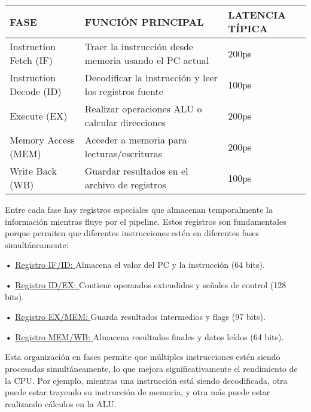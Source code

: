 \documentclass{article}
\begin{document}
\quad

\begin{tabular}{| p{4cm} |p{4cm} | p{4cm} |}
    \hline
    FASE & FUNCIÓN PRINCIPAL & LATENCIA TÍPICA \\
    \hline
    Instruction Fetch (IF) & Traer la instrucción desde memoria usando el PC actual & 200ps
\\
    \hline
    Instruction Decode (ID) & Decodificar la instrucción y leer los registros fuente & 100ps \\
    \hline
    Execute (EX) & Realizar operaciones ALU o calcular direcciones & 200ps \\
    \hline
    Memory Access (MEM) & Acceder a memoria para lecturas/escrituras & 200ps \\
    \hline
    Write Back (WB) & Guardar resultados en el archivo de registros & 100ps
 \\
    \hline

\end{tabular}\vspace{0.8cm}

{ Entre cada fase hay registros especiales que almacenan temporalmente la información mientras fluye por el pipeline. Estos registros son fundamentales porque permiten que diferentes instrucciones estén en diferentes fases simultáneamente:}

\quad

\textbf{•   } \underline{Registro IF/ID: } { Almacena el valor del PC y la instrucción (64 bits).}

\textbf{•   } \underline{Registro ID/EX: } { Contiene operandos extendidos y señales de control (128 bits).}

\textbf{•   } \underline{Registro EX/MEM: } { Guarda resultados intermedios y flags (97 bits).}

\textbf{•   } \underline{Registro MEM/WB: } { Almacena resultados finales y datos leídos (64 bits).}

\quad

{ Esta organización en fases permite que múltiples instrucciones estén siendo procesadas simultáneamente, lo que mejora significativamente el rendimiento de la CPU. Por ejemplo, mientras una instrucción está siendo decodificada, otra puede estar trayendo su instrucción de memoria, y otra más puede estar realizando cálculos en la ALU. }

\quad
\newpage
\end{document}
